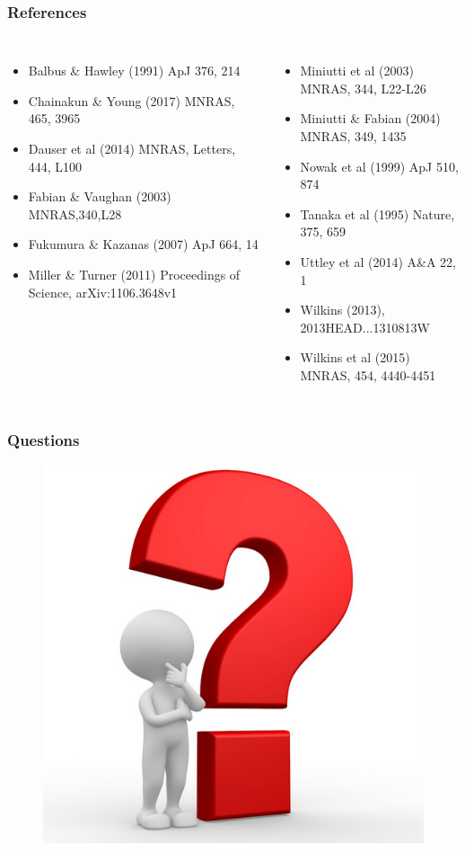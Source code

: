 \documentclass[]{beamer}
\begin{document}
\begin{frame}
  \frametitle{References}

\begin{columns}
{\footnotesize  
\begin{itemize} 
  \item{Balbus \& Hawley (1991) ApJ 376, 214}
  \item{Chainakun \& Young (2017) MNRAS, 465, 3965}
  \item{Dauser et al (2014) MNRAS, Letters, 444, L100} 
  \item{Fabian \& Vaughan (2003) MNRAS,340,L28}
  \item{Fukumura \& Kazanas (2007) ApJ 664, 14}
  \item{Miller \& Turner (2011) Proceedings of Science, arXiv:1106.3648v1}
\end{itemize}
}
{\footnotesize
\begin{itemize}
    \item{Miniutti et al (2003) MNRAS, 344, L22-L26}
  \item{Miniutti \& Fabian (2004) MNRAS, 349, 1435}
  \item{Nowak et al (1999) ApJ 510, 874}
  \item{Tanaka et al (1995) Nature, 375, 659}
  \item{Uttley et al (2014) A\&A 22, 1}
  \item{Wilkins (2013), 2013HEAD...1310813W}
  \item{Wilkins et al (2015) MNRAS, 454, 4440-4451}
\end{itemize}
}
\end{columns}
\end{frame}

\begin{frame}
\frametitle{Questions}
\begin{figure}\centering
\colorbox{white}{\includegraphics[scale=.4]{Questions1.png}}\\
\end{figure}
\end{frame}
\end{document}
